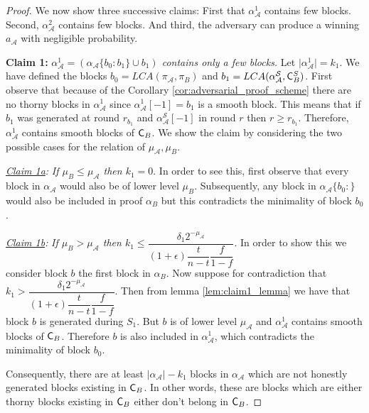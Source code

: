 \begin{proof}
We now show three successive claims: First that $\alpha_\mathcal{A}^1$ contains few blocks. Second, $\alpha_\mathcal{A}^2$ contains few blocks. And third, the adversary can produce a winning $a_\mathcal{A}$ with negligible probability.

\textbf{Claim 1:} \textit{$\alpha_\mathcal{A}^1 = (\alpha_\mathcal{A}\{b_0 : b_1\} \cup b_1)$ contains only a few blocks.} Let $\lvert \alpha^1_\mathcal{A} \rvert = k_1$. We have defined the blocks $b_0 = LCA(\pi_\mathcal{A}, \pi_B)$ and $b_1 = LCA(\alpha^{\mathcal{S}}_\mathcal{A}, \mathsf{C}^S_B)$. First observe that because of the Corollary \ref{cor:adversarial_proof_scheme} there are no thorny blocks in $\alpha_\mathcal{A}^1$ since $\alpha_\mathcal{A}^1[-1] = b_1$ is a smooth block. This means that if $b_1$ was generated at round $r_{b_1}$ and $\alpha^{\mathcal{S}}_\mathcal{A}[-1]$ in round $r$ then $r \geq r_{b_1}$. Therefore, $\alpha_\mathcal{A}^1$ contains smooth blocks of $\mathsf{C}_B$. We show the claim by considering the two possible cases for the relation of $\mu_\mathcal{A}, \mu_B$.

\textit{\underline{Claim 1a}:} \textit{If $\mu_B \leq \mu_\mathcal{A}$ then $k_1 = 0$}. In order to see this, first observe that every block in $\alpha_\mathcal{A}$ would also be of lower level $\mu_B$. Subsequently, any block in $\alpha_\mathcal{\mathcal{A}}\{b_0{:}\}$ would also be included in proof $\alpha_B$ but this contradicts the minimality of block $b_0$.

\textit{\underline{Claim 1b}:} \textit{If $\mu_B > \mu_\mathcal{A}$ then $k_1 \leq \dfrac{\delta_1 2^{-\mu_\mathcal{A}}}{(1+\epsilon)\dfrac{t}{n-t}\dfrac{f}{1-f}}$}. In order to show this we consider block $b$ the first block in $\alpha_B$. Now suppose for contradiction that $k_1 > \dfrac{\delta_1 2^{-\mu_\mathcal{A}}}{(1+\epsilon)\dfrac{t}{n-t}\dfrac{f}{1-f}}$. Then from lemma \ref{lem:claim1_lemma} we have that block $b$ is generated during $S_1$. But $b$ is of lower level $\mu_\mathcal{A}$ and $\alpha^1_\mathcal{A}$ contains smooth blocks of $\mathsf{C}_B$. Therefore $b$ is also included in $\alpha^1_\mathcal{A}$, which contradicts the minimality of block $b_0$.

Consequently, there are at least $\lvert \alpha_\mathcal{A} \rvert - k_1$ blocks in $\alpha_\mathcal{A}$ which are not honestly generated blocks existing in $\mathsf{C}_B$. In other words, these are blocks which are either thorny blocks existing in $\mathsf{C}_B$ either don't belong in $\mathsf{C}_B$.


\end{proof}
